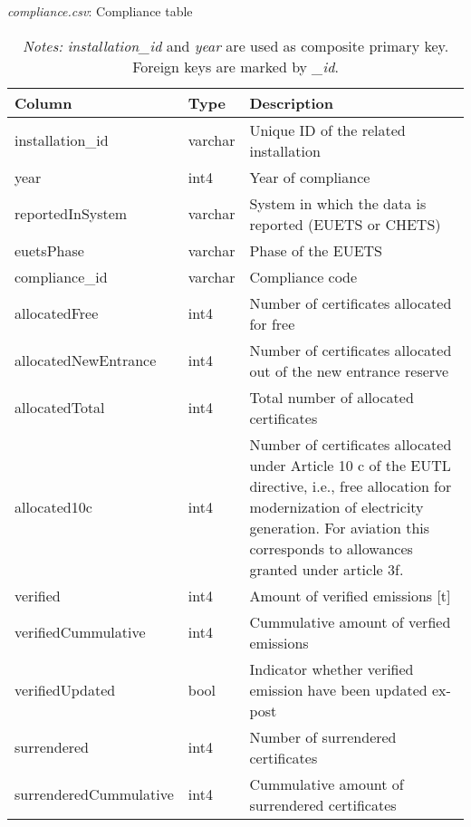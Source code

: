 \documentclass[authoryear]{elsarticle}
\begin{document}
\begin{table}[htbp]\scriptsize
	\caption{\textit{compliance.csv}: Compliance table}\label{tab:tbl_compliance}
	\centering
	\begin{tabular*}{\textwidth}{@{}@{\extracolsep{\fill}} llp{8cm} @{}}
		\toprule
		\toprule
		\textbf{Column} & \textbf{Type}  & \textbf{Description} \\
		\midrule
		installation\_id & varchar & Unique ID of the related installation \\
		year  & int4  & Year of compliance \\
		reportedInSystem & varchar  & System in which the data is reported (EUETS or CHETS) \\
		euetsPhase & varchar & Phase of the EUETS \\
		compliance\_id & varchar & Compliance code \\
		allocatedFree & int4  & Number of certificates allocated for free \\
		allocatedNewEntrance & int4  & Number of certificates allocated out of the new entrance reserve \\
		allocatedTotal & int4  & Total number of allocated certificates \\
		allocated10c & int4  & Number of certificates allocated under Article 10 c of the EUTL directive, i.e., free allocation for modernization of electricity generation. For aviation this corresponds to allowances granted under article 3f. \\
		verified & int4  & Amount of verified emissions [t] \\
		verifiedCummulative & int4  & Cummulative amount of verfied emissions \\
		verifiedUpdated & bool  & Indicator whether verified emission have been updated ex-post \\
		surrendered & int4  & Number of surrendered certificates \\
		surrenderedCummulative & int4  & Cummulative amount of surrendered certificates \\
		\bottomrule
		\bottomrule
	\end{tabular*}%
	\vspace{-3ex}
	\caption*{\footnotesize \emph{Notes:} \textit{installation\_id} and \textit{year} are used as composite primary key. Foreign keys are marked by \textit{\_id}.}
	\vspace{0ex}
\end{table}
\end{document}

